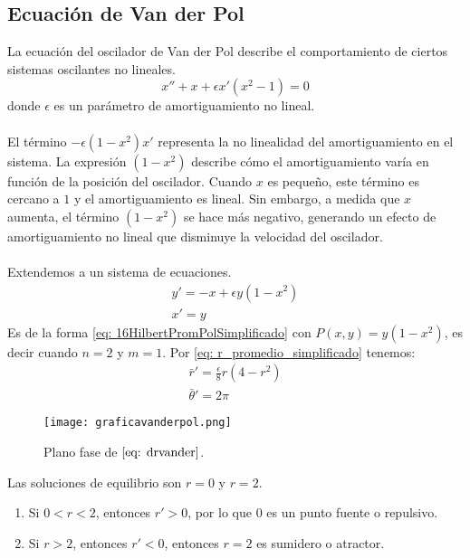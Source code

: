 \subsection{Ecuación de Van der Pol}
La ecuación del oscilador de Van der Pol describe el comportamiento de ciertos sistemas oscilantes no lineales.
\begin{equation}\label{eq: VP}
	x''+x+\epsilon x'(x^2-1)=0
\end{equation}
donde $\epsilon$ es un parámetro de amortiguamiento no lineal.\\
\\El término $-\epsilon(1 - x^2)x'$ representa la no linealidad del amortiguamiento en el sistema. La expresión
$(1 - x^2)$ describe cómo el amortiguamiento varía en función de la posición del oscilador. Cuando $x$ es
pequeño, este término es cercano a $1$ y el amortiguamiento es lineal. Sin embargo, a medida que $x$
aumenta, el término $(1 - x^2)$ se hace más negativo, generando un efecto de amortiguamiento no lineal que
disminuye la velocidad del oscilador.\\
\\Extendemos a un sistema de ecuaciones.
\begin{equation}\label{eq: VPsis}
	\begin{matrix}
		y'=-x+\epsilon y(1-x^2) \\
		x'=y
	\end{matrix}
\end{equation}
Es de la forma \eqref{eq: 16HilbertPromPolSimplificado} con $P(x,y)=y(1-x^2)$, es decir cuando $n=2$ y $m=1$.
Por \eqref{eq: r_promedio_simplificado} tenemos:
\begin{equation}\label{eq: drvander}
	\begin{matrix}
		\bar{r}'=\frac{\epsilon}{8}r(4-r^2) \\
		\bar{\theta}'=2\pi
	\end{matrix}
\end{equation}
\begin{figure}[h]
	\centering
	\texttt{[image: graficavanderpol.png]}
	\caption{Plano fase de $\eqref{eq: drvander}$.}
\end{figure}
Las soluciones de equilibrio son $r=0$ y $r=2$.
\begin{enumerate}
	\item Si $0<r<2$, entonces $r'>0$, por lo que $0$ es un punto fuente o repulsivo.
	\item Si $r>2$, entonces $r'<0$, entonces $r=2$ es sumidero o atractor.
\end{enumerate}

